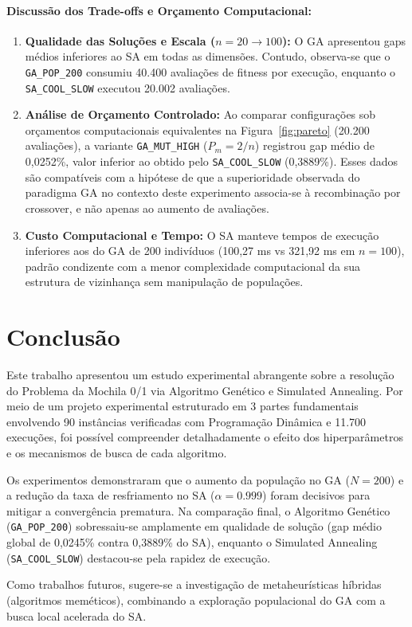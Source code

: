 \documentclass[12pt]{article}
\begin{document}
\paragraph{Discussão dos Trade-offs e Orçamento Computacional:}
\begin{enumerate}
    \item \textbf{Qualidade das Soluções e Escala ($n=20 \to 100$):} O GA apresentou gaps médios inferiores ao SA em todas as dimensões. Contudo, observa-se que o \texttt{GA\_POP\_200} consumiu 40.400 avaliações de fitness por execução, enquanto o \texttt{SA\_COOL\_SLOW} executou 20.002 avaliações.
    \item \textbf{Análise de Orçamento Controlado:} Ao comparar configurações sob orçamentos computacionais equivalentes na Figura~\ref{fig:pareto} (20.200 avaliações), a variante \texttt{GA\_MUT\_HIGH} ($P_m=2/n$) registrou gap médio de 0,0252\%, valor inferior ao obtido pelo \texttt{SA\_COOL\_SLOW} (0,3889\%). Esses dados são compatíveis com a hipótese de que a superioridade observada do paradigma GA no contexto deste experimento associa-se à recombinação por crossover, e não apenas ao aumento de avaliações.
    \item \textbf{Custo Computacional e Tempo:} O SA manteve tempos de execução inferiores aos do GA de 200 indivíduos (100,27 ms vs 321,92 ms em $n=100$), padrão condizente com a menor complexidade computacional da sua estrutura de vizinhança sem manipulação de populações.
\end{enumerate}

\section{Conclusão}

Este trabalho apresentou um estudo experimental abrangente sobre a resolução do Problema da Mochila 0/1 via Algoritmo Genético e Simulated Annealing. Por meio de um projeto experimental estruturado em 3 partes fundamentais envolvendo 90 instâncias verificadas com Programação Dinâmica e 11.700 execuções, foi possível compreender detalhadamente o efeito dos hiperparâmetros e os mecanismos de busca de cada algoritmo.

Os experimentos demonstraram que o aumento da população no GA ($N=200$) e a redução da taxa de resfriamento no SA ($\alpha=0.999$) foram decisivos para mitigar a convergência prematura. Na comparação final, o Algoritmo Genético (\texttt{GA\_POP\_200}) sobressaiu-se amplamente em qualidade de solução (gap médio global de 0,0245\% contra 0,3889\% do SA), enquanto o Simulated Annealing (\texttt{SA\_COOL\_SLOW}) destacou-se pela rapidez de execução.

Como trabalhos futuros, sugere-se a investigação de metaheurísticas híbridas (algoritmos meméticos), combinando a exploração populacional do GA com a busca local acelerada do SA.



\end{document}
